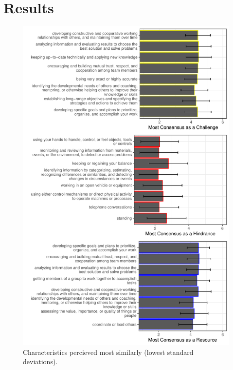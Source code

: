 \documentclass[
  man,mask]{apa7}
\begin{document}
\hypertarget{results}{%
\section{Results}\label{results}}

\begin{figure}
\centering
\includegraphics{Submission_files/figure-latex/combinegraphs-1.pdf}
\caption{\label{fig:combinegraphs}Characteristics percieved most similarly (lowest standard deviations).}
\end{figure}
\end{document}
